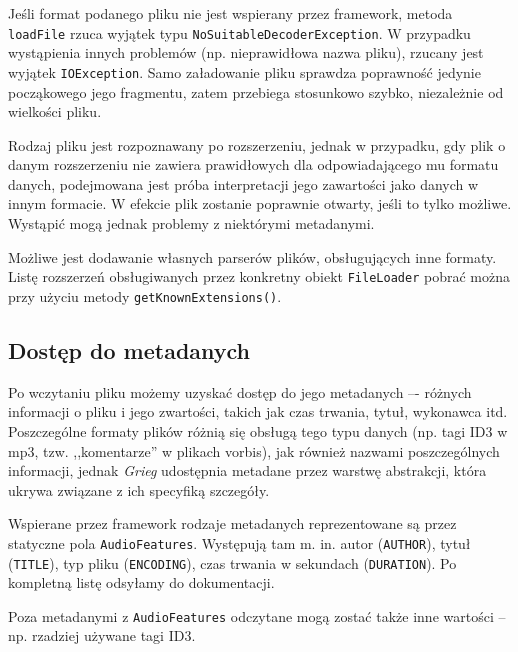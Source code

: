 Jeśli format podanego pliku nie jest wspierany przez framework, metoda \texttt{loadFile} rzuca
wyjątek typu \texttt{NoSuitableDecoderException}. W przypadku wystąpienia innych problemów (np.
nieprawidłowa nazwa pliku), rzucany jest wyjątek \texttt{IOException}. Samo załadowanie pliku
sprawdza poprawność jedynie począkowego jego fragmentu, zatem przebiega stosunkowo szybko,
niezależnie od wielkości pliku.

\begin{Tip}
Rodzaj pliku jest rozpoznawany po rozszerzeniu, jednak w przypadku, gdy plik o danym rozszerzeniu
nie zawiera prawidłowych dla odpowiadającego mu formatu danych, podejmowana jest próba interpretacji
jego zawartości jako danych w innym formacie. W efekcie plik zostanie poprawnie otwarty, jeśli to
tylko możliwe. Wystąpić mogą jednak problemy z niektórymi metadanymi.
\end{Tip}

\begin{Note}
Możliwe jest dodawanie własnych parserów plików, obsługujących inne formaty. Listę rozszerzeń
obsługiwanych przez konkretny obiekt \texttt{FileLoader} pobrać można przy użyciu metody
\texttt{getKnownExtensions()}.
\end{Note}


\subsection{Dostęp do metadanych}

Po wczytaniu pliku możemy uzyskać dostęp do jego metadanych –- różnych informacji o pliku i jego
zwartości, takich jak czas trwania, tytuł, wykonawca itd. Poszczególne formaty plików różnią się
obsługą tego typu danych (np. tagi ID3 w mp3, tzw. ,,komentarze'' w plikach vorbis), jak również
nazwami poszczególnych informacji, jednak \emph{Grieg} udostępnia metadane przez warstwę abstrakcji,
która ukrywa związane z ich specyfiką szczegóły.

Wspierane przez framework rodzaje metadanych reprezentowane są przez statyczne pola
\texttt{AudioFeatures}. Występują tam m. in. autor (\texttt{AUTHOR}), tytuł (\texttt{TITLE}), typ
pliku (\texttt{ENCODING}), czas trwania w sekundach (\texttt{DURATION}). Po kompletną listę odsyłamy
do dokumentacji.

\begin{Note}
Poza metadanymi z \texttt{AudioFeatures} odczytane mogą zostać także inne wartości -- np. rzadziej
używane tagi ID3.
\end{Note}

